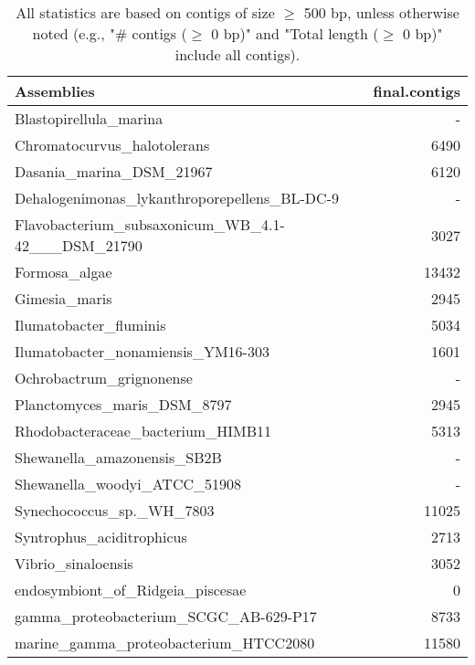 \documentclass[12pt,a4paper]{article}
\begin{document}
\begin{table}[ht]
\begin{center}
\caption{All statistics are based on contigs of size $\geq$ 500 bp, unless otherwise noted (e.g., "\# contigs ($\geq$ 0 bp)" and "Total length ($\geq$ 0 bp)" include all contigs).}
\begin{tabular}{|l*{1}{|r}|}
\hline
Assemblies & final.contigs \\ \hline
Blastopirellula\_marina & - \\ \hline
Chromatocurvus\_halotolerans & 6490 \\ \hline
Dasania\_marina\_DSM\_21967 & 6120 \\ \hline
Dehalogenimonas\_lykanthroporepellens\_BL-DC-9 & - \\ \hline
Flavobacterium\_subsaxonicum\_WB\_4.1-42\_\_\_DSM\_21790 & 3027 \\ \hline
Formosa\_algae & 13432 \\ \hline
Gimesia\_maris & 2945 \\ \hline
Ilumatobacter\_fluminis & 5034 \\ \hline
Ilumatobacter\_nonamiensis\_YM16-303 & 1601 \\ \hline
Ochrobactrum\_grignonense & - \\ \hline
Planctomyces\_maris\_DSM\_8797 & 2945 \\ \hline
Rhodobacteraceae\_bacterium\_HIMB11 & 5313 \\ \hline
Shewanella\_amazonensis\_SB2B & - \\ \hline
Shewanella\_woodyi\_ATCC\_51908 & - \\ \hline
Synechococcus\_sp.\_WH\_7803 & 11025 \\ \hline
Syntrophus\_aciditrophicus & 2713 \\ \hline
Vibrio\_sinaloensis & 3052 \\ \hline
endosymbiont\_of\_Ridgeia\_piscesae & 0 \\ \hline
gamma\_proteobacterium\_SCGC\_AB-629-P17 & 8733 \\ \hline
marine\_gamma\_proteobacterium\_HTCC2080 & 11580 \\ \hline
\end{tabular}
\end{center}
\end{table}
\end{document}
